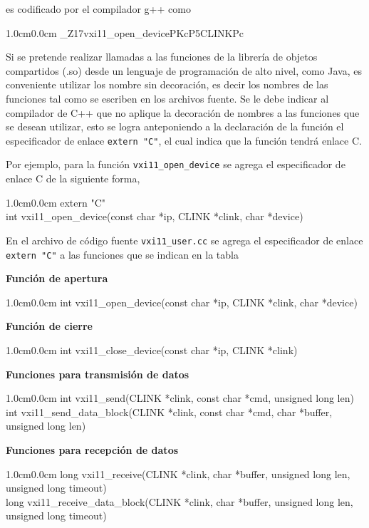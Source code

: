 \documentclass[paper=letter,oneside,fontsize=11pt, parskip=full]{scrartcl}
\newenvironment{code}
	{\begin{adjustwidth}{1.0cm}{0.0cm}\ttfamily}
	{\end{adjustwidth}}
\begin{document}
	es codificado por el compilador g++ como 
	
	\begin{code}
		\_Z17vxi11\_open\_devicePKcP5CLINKPc		
	\end{code}

	Si se pretende realizar llamadas a las funciones de la librería de objetos compartidos (.so) desde un lenguaje de programación de alto nivel, como Java, es conveniente utilizar los nombre sin decoración, es decir los nombres de las funciones tal como se escriben en los archivos fuente. Se le debe indicar al compilador de C++ que no aplique la decoración de nombres a las funciones que se desean utilizar, esto se logra anteponiendo a la declaración de la función el especificador de enlace \texttt{extern~"C"}, el cual indica que la función tendrá enlace C.
	
	Por ejemplo, para la función \texttt{vxi11\_open\_device} se agrega el especificador de enlace C de la siguiente forma,
	
	\begin{code}
		\ttfamily
		extern "C" \\
		int vxi11\_open\_device(const char *ip, CLINK *clink, char *device) 
	\end{code}

	En el archivo de código fuente \texttt{vxi11\_user.cc} se agrega el especificador de enlace \texttt{extern "C"} a las funciones que se indican en la tabla 

	\textbf{Función de apertura}
	\begin{code}
		int	vxi11\_open\_device(const char *ip, CLINK *clink, char *device) 
	\end{code}

	\textbf{Función de cierre}
	\begin{code}
		int vxi11\_close\_device(const char *ip, CLINK *clink)
	\end{code}

	\textbf{Funciones para transmisión de datos}
	\begin{code}
		int	vxi11\_send(CLINK *clink, const char *cmd, unsigned long len) \\		
		int	vxi11\_send\_data\_block(CLINK *clink, const char *cmd, char *buffer, unsigned long len) 		 		
	\end{code}

	\textbf{Funciones para recepción de datos}
	\begin{code}
		long vxi11\_receive(CLINK *clink, char *buffer, unsigned long len, unsigned long timeout) \\	
		long vxi11\_receive\_data\_block(CLINK *clink, char *buffer, unsigned long len, unsigned long timeout) 			
	\end{code}		
\end{document}
